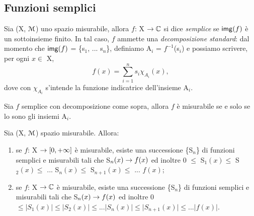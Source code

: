 \documentclass[Completo.tex]{subfiles}
\begin{document}
	\subsection{Funzioni semplici}
	\begin{Def}
		Sia (X, $\eu[M]$) uno spazio misurabile, allora $f$: X $\ra \bb[C]$ si dice \textit{semplice} se $\sf[img](f)$ è un sottoinsieme finito. In tal caso, $f$ ammette una \textit{decomposizione standard}: dal momento che $\sf[img](f)$ = \{s$_1$, ... s$_n$\}, definiamo A$_i$ = $f^{-1}$(s$_i$) e possiamo scrivere, per ogni $x \in$ X,
		\begin{equation*}
		f(x) = \sum\limits_{i=1}^{n} s_i \chi_{A_i}(x),
		\end{equation*}
		dove con $\chi_{A_i}$ s'intende la funzione indicatrice dell'insieme A$_i$.
	\end{Def}
	\begin{Prop}
		Sia $f$ semplice con decomposizione come sopra, allora $f$ è misurabile se e solo se lo sono gli insiemi A$_i$.
	\end{Prop}
	\begin{eTh}
		Sia (X, $\eu[M]$) spazio misurabile. Allora:
		\begin{enumerate}
			\item se $f$: X $\rightarrow [0, +\infty]$ è misurabile, esiste una successione \{S$_n$\} di funzioni semplici e misurabili tali che S$_n(x) \rightarrow f(x)$ ed inoltre 0 $\leq$ S$_1(x) \leq$ S$_2(x) \leq$ ... S$_n(x) \leq$ S$_{n+1}(x) \leq$ ... $f(x)$;
			\item se $f$: X $\ra \bb[C]$ è misurabile, esiste una successione \{S$_n$\} di funzioni semplici e misurabili tali che S$_n(x) \rightarrow f(x)$ ed inoltre 0 $\leq \vert S_1(x) \vert \leq \vert S_2(x) \vert \leq ... \vert S_n(x) \vert \leq \vert S_{n+1}(x) \vert \leq ... \vert f(x) \vert$.
		\end{enumerate}
	\end{eTh}
\end{document}
